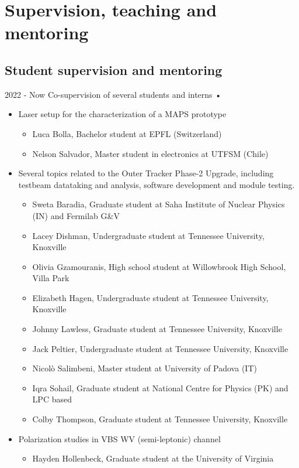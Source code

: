 \section{Supervision, teaching and mentoring}

\subsection{Student supervision and mentoring}
   \teaching
    {2022 - Now}
    {Co-supervision of several students and interns • }{
    \begin{itemize}
    \item Laser setup for the characterization of a MAPS prototype
	\begin{itemize}
	\item Luca Bolla, Bachelor student at EPFL (Switzerland)
	\item Nelson Salvador, Master student in electronics at UTFSM (Chile)
	\end{itemize}
    \item Several topics related to the  Outer Tracker Phase-2 Upgrade, including testbeam datataking and analysis, software development and module testing.
    \begin{itemize}
    \item Sweta Baradia, Graduate student at Saha Institute of Nuclear Physics (IN) and Fermilab G\&V
    \item Lacey Dishman, Undergraduate student at Tennessee University, Knoxville 
    \item Olivia Gzamouranis, High school student at Willowbrook High School, Villa Park
    \item Elizabeth Hagen, Undergraduate student at Tennessee University, Knoxville 
    \item Johnny Lawless, Graduate student at Tennessee University, Knoxville 
    \item Jack Peltier, Undergraduate student at Tennessee University, Knoxville  
    \item Nicol\`{o} Salimbeni, Master student at University of Padova (IT)
    \item Iqra Sohail, Graduate student at National Centre for Physics (PK) and LPC based
    \item Colby Thompson, Graduate student at Tennessee University, Knoxville 
    \end{itemize}
	\item Polarization studies in VBS WV (semi-leptonic) channel
	\begin{itemize}
	\item Hayden Hollenbeck, Graduate student at the University of Virginia
	\end{itemize}
	





    \end{itemize}
    }
